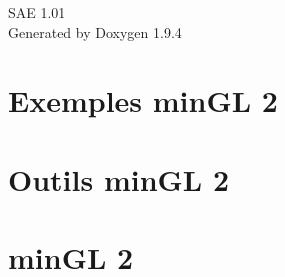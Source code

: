 \documentclass[twoside]{book}
\newcommand{\+}{\discretionary{\mbox{\scriptsize$\hookleftarrow$}}{}{}}
\newcommand{\clearemptydoublepage}{%
    \newpage{\pagestyle{empty}\cleardoublepage}%
  }
\begin{document}
  \raggedbottom
    \hypersetup{pageanchor=false,
                bookmarksnumbered=true,
                pdfencoding=unicode
               }
  \begin{titlepage}
  \vspace*{7cm}
  \begin{center}%
  {\Large SAE 1.\+01}\\
  \vspace*{1cm}
  {\large Generated by Doxygen 1.9.4}\\
  \end{center}
  \end{titlepage}
  \clearemptydoublepage
  \tableofcontents
  \clearemptydoublepage
  \hypersetup{pageanchor=true}
\chapter{Exemples min\+GL 2}
\label{md__home__theo__t_xC3_xA9l_xC3_xA9chargements_sae__s_a_e__j_e_u__min_g_l2__i_u_t__a_i_x_master_examples__r_e_a_d_m_e}

\chapter{Outils min\+GL 2}
\label{md__home__theo__t_xC3_xA9l_xC3_xA9chargements_sae__s_a_e__j_e_u__min_g_l2__i_u_t__a_i_x_master_tools__r_e_a_d_m_e}

\chapter{min\+GL 2}
\label{md__home__theo__t_xC3_xA9l_xC3_xA9chargements_sae__s_a_e__j_e_u__min_g_l2__i_u_t__a_i_x_master__r_e_a_d_m_e}

\end{document}
